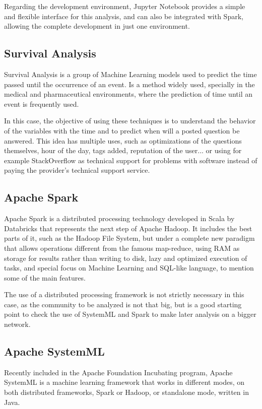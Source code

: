 \documentclass[11pt]{book} %
\begin{document}
    Regarding the development environment, Jupyter Notebook provides a simple and flexible interface for this analysis, and can also be integrated with Spark, allowing the complete development in just one environment.

  \subsection{Survival Analysis}

    Survival Analysis is a group of Machine Learning models used to predict the time passed until the occurrence of an event. Is a method widely used, specially in the medical and pharmaceutical environments, where the prediction of time until an event is frequently used.

    In this case, the objective of using these techniques is to understand the behavior of the variables with the time and to predict when will a posted question be answered. This idea has multiple uses, such as optimizations of the questions themselves, hour of the day, tags added, reputation of the user... or using for example StackOverflow as technical support for problems with software instead of paying the provider's technical support service.

  \subsection{Apache Spark}

    Apache Spark is a distributed processing technology developed in Scala by Databricks that represents the next step of Apache Hadoop. It includes the best parts of it, such as the Hadoop File System, but under a complete new paradigm that allows operations different from the famous map-reduce, using RAM as storage for results rather than writing to disk, lazy and optimized execution of tasks, and special focus on Machine Learning and SQL-like language, to mention some of the main features.

    The use of a distributed processing framework is not strictly necessary in this case, as the community to be analyzed is not that big, but is a good starting point to check the use of SystemML and Spark to make later analysis on a bigger network.

  \subsection{Apache SystemML}

    Recently included in the Apache Foundation Incubating  program, Apache SystemML is a machine learning framework that works in different modes, on both distributed frameworks, Spark or Hadoop, or standalone mode, written in Java.
\end{document}
